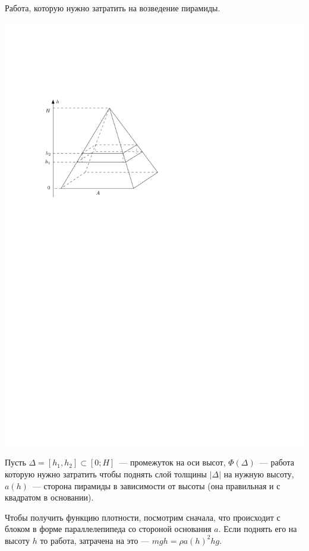 \documentclass[12pt]{../../notes}
\begin{document}
\begin{exmp}
  Работа, которую нужно затратить на
  возведение пирамиды.
  
  \medskip
  
  \includegraphics[scale=0.85]{pir}
  
  Пусть $\Delta = \left[ h_1, h_2 \right] \subset \left[ 0 ; H \right]$~--- промежуток на оси высот, 
  $\Phi \left(\Delta \right)$~--- работа которую нужно
  затратить чтобы поднять слой толщины $\left| \Delta \right|$ на нужную высоту, $a \left( h \right)$~---
  сторона пирамиды в зависимости от высоты (она правильная и с квадратом в  основании).
  
  Чтобы получить функцию плотности,
  посмотрим сначала, что происходит с
  блоком в форме параллелепипеда со
  стороной основания $a$. Если поднять его на
  высоту $h$ то работа, затрачена на это
  --- $mgh = \rho a \left( h \right)^2 hg$.
  

\end{exmp}
\end{document}
